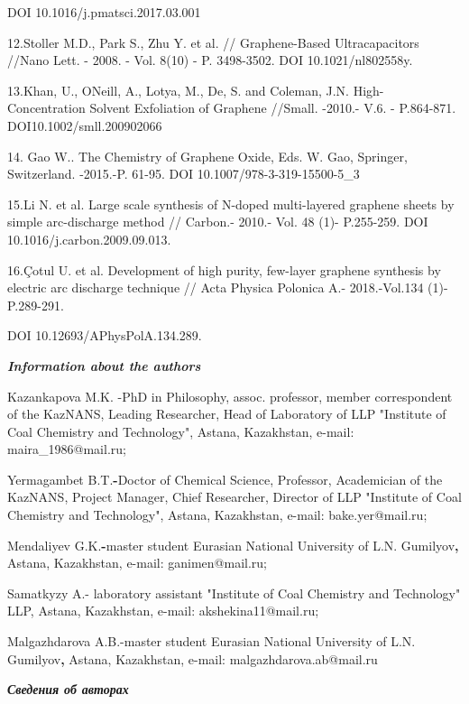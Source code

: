 \begin{noparindent}
DOI 10.1016/j.pmatsci.2017.03.001

12.Stoller M.D., Park S., Zhu Y. et al. // Graphene-Based
Ultracapacitors //Nano Lett. - 2008. - Vol. 8(10) - P. 3498-3502. DOI
10.1021/nl802558y.

13.Khan, U., O\textquotesingle Neill, A., Lotya, M., De, S. and Coleman,
J.N. High-Concentration Solvent Exfoliation of Graphene //Small. -2010.-
V.6. - P.864-871. DOI10.1002/smll.200902066

14. Gao W.. The Chemistry of Graphene Oxide, Eds. W. Gao, Springer,
Switzerland. -2015.-P. 61-95. DOI 10.1007/978-3-319-15500-5\_3~

15.Li N. et al. Large scale synthesis of N-doped multi-layered graphene
sheets by simple arc-discharge method // Carbon.- 2010.- Vol. 48 (1)-
P.255-259. DOI 10.1016/j.carbon.2009.09.013.

16.Çotul U. et al. Development of high purity, few-layer graphene
synthesis by electric arc discharge technique // Acta Physica Polonica
A.- 2018.-Vol.134 (1)- P.289-291.

DOI 10.12693/APhysPolA.134.289.
\end{noparindent}

\emph{{\bfseries Information about the authors}}

\begin{noparindent}
Kazankapova M.K. -PhD in Philosophy, assoc. professor, member
correspondent of the KazNANS, Leading Researcher, Head of Laboratory of
LLP "Institute of Coal Chemistry and Technology", Astana, Kazakhstan,
e-mail: maira\_1986@mail.ru;

Yermagambet B.T.{\bfseries -}Doctor of Chemical Science, Professor,
Academician of the KazNANS, Project Manager, Chief Researcher, Director
of LLP "Institute of Coal Chemistry and Technology", Astana, Kazakhstan,
e-mail: bake.yer@mail.ru;

Mendaliyev G.K.{\bfseries -}master student Eurasian National University of
L.N. Gumilyov{\bfseries ,} Astana, Kazakhstan, e-mail: ganimen@mail.ru;

Samatkyzy A.- laboratory assistant "Institute of Coal Chemistry and
Technology" LLP, Astana, Kazakhstan, e-mail: akshekina11@mail.ru;

Malgazhdarova A.B.-master student Eurasian National University of L.N.
Gumilyov{\bfseries ,} Astana, Kazakhstan, e-mail: malgazhdarova.ab@mail.ru
\end{noparindent}

\emph{{\bfseries Сведения об авторах}}

